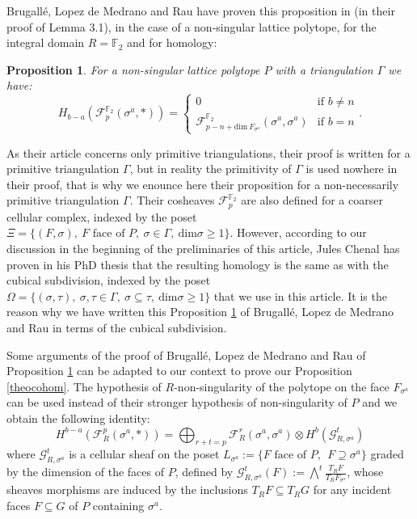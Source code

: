 \documentclass{article}
\newtheorem{proposition}{Proposition}
\begin{document}
Brugallé, Lopez de Medrano and Rau have proven this proposition in \cite{BMR 2024} (in their proof of Lemma 3.1), in the case of a non-singular lattice polytope, for the integral domain $R=\mathbb{F}_2$ and for homology:

\begin{proposition}
    \cite{BMR 2024} For a non-singular lattice polytope $P$ with a triangulation $\Gamma$ we have:
    \begin{equation*}
        H_{b-a}(\mathcal{F}^{\mathbb{F}_2}_p(\sigma^a,*)) = \left \{ \begin{array}{ll}
            0 & \text{if } b\neq n \\
            \mathcal{F}^{\mathbb{F}_2}_{p - n + \mathrm{dim} ~ F_{\sigma^a}}(\sigma^a,\sigma^a) & \text{if } b=n
        \end{array} \right . .
    \end{equation*}
    \label{BMR}
\end{proposition}

As their article \cite{BMR 2024} concerns only primitive triangulations, their proof is written for a primitive triangulation $\Gamma$, but in reality the primitivity of $\Gamma$ is used nowhere in their proof, that is why we enounce here their proposition for a non-necessarily primitive triangulation $\Gamma$. Their cosheaves $\mathcal{F}_p^{\mathbb{F}_2}$ are also defined for a coarser cellular complex, indexed by the poset $\Xi=\{(F,\sigma),~ F \text{ face of } P,~\sigma\in \Gamma,~\mathrm{dim} \sigma\geq 1\}$. However, according to our discussion in the beginning of the preliminaries of this article, Jules Chenal has proven in his PhD thesis \cite{Ch 2024} that the resulting homology is the same as with the cubical subdivision, indexed by the poset $\Omega=\{(\sigma,\tau),~\sigma,\tau \in \Gamma,~\sigma \subseteq \tau,~\mathrm{dim}\sigma \geq 1\}$ that we use in this article. It is the reason why we have written this Proposition \ref{BMR} of Brugallé, Lopez de Medrano and Rau in terms of the cubical subdivision.

Some arguments of the proof of Brugallé, Lopez de Medrano and Rau of Proposition \ref{BMR} can be adapted to our context to prove our Proposition \ref{theocohom}. The hypothesis of $R$-non-singularity of the polytope on the face $F_{\sigma^a}$ can be used instead of their stronger hypothesis of non-singularity of $P$ and we obtain the following identity:
\begin{equation}
    H^{b-a}(\mathcal{F}^p_R(\sigma^a,*))= \bigoplus_{r+t = p} \mathcal{F}^r_R(\sigma^a,\sigma^a) \otimes H^{b}(\mathcal{G}^t_{R,\sigma^a})
    \label{dirsum}
\end{equation}
where $\mathcal{G}^t_{R,\sigma^a}$ is a cellular sheaf on the poset $L_{\sigma^a}:=\{F \text{ face of }P,~~ F\supseteq \sigma^a\}$ graded by the dimension of the faces of $P$, defined by $\mathcal{G}^t_{R,\sigma^a}(F):=\bigwedge^t\frac{T_RF}{T_RF_{\sigma^a}}$, whose sheaves morphisms are induced by the inclusions $T_RF\subseteq T_RG$ for any incident faces $F\subseteq G$ of $P$ containing $\sigma^a$.
\end{document}
